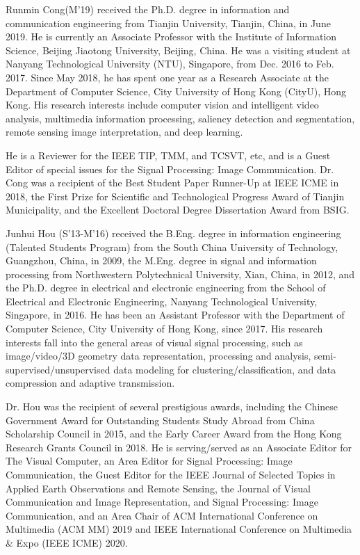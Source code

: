 \documentclass[journal]{IEEEtran}
\begin{document}
\vspace{-10 mm}
\begin{IEEEbiography}{Runmin Cong}(M'19)
received the Ph.D. degree in information and communication engineering from Tianjin University, Tianjin, China, in June 2019.
He is currently an Associate Professor with the Institute of Information Science, Beijing Jiaotong University, Beijing, China. He was a visiting student at Nanyang Technological University (NTU), Singapore, from Dec. 2016 to Feb. 2017. Since May 2018, he has spent one year as a Research Associate at the Department of Computer Science, City University of Hong Kong (CityU), Hong Kong. His research interests include computer vision and intelligent video analysis, multimedia information processing, saliency detection and segmentation, remote sensing image interpretation, and deep learning.\par
He is a Reviewer for the IEEE TIP, TMM, and TCSVT, etc, and is a Guest Editor of special issues for the Signal Processing: Image Communication. Dr. Cong was a recipient of the Best Student Paper Runner-Up at IEEE ICME in 2018, the First Prize for Scientific and Technological Progress Award of Tianjin Municipality, and the Excellent Doctoral Degree Dissertation Award from BSIG.
\end{IEEEbiography}
\vspace{-10 mm}
\begin{IEEEbiography}{Junhui Hou}
(S'13-M'16) received the B.Eng. degree in information engineering (Talented Students Program) from the South China University of Technology, Guangzhou, China, in 2009, the M.Eng. degree in signal and information processing from Northwestern Polytechnical University, Xian, China, in 2012, and the Ph.D. degree in electrical and electronic engineering from the School of Electrical and Electronic Engineering, Nanyang Technological University, Singapore, in 2016. He has been an Assistant Professor with the Department of Computer Science, City University of Hong Kong, since 2017. His research interests fall into the general areas of visual signal processing, such as image/video/3D geometry data representation, processing and analysis, semi-supervised/unsupervised data modeling for clustering/classification, and data compression and adaptive transmission.\par
Dr. Hou was the recipient of several prestigious awards, including the Chinese Government Award for Outstanding Students Study Abroad from China Scholarship Council in 2015, and the Early Career Award from the Hong Kong Research Grants Council in 2018. He is serving/served as an Associate Editor for The Visual Computer, an Area Editor for Signal Processing: Image Communication, the Guest Editor for the IEEE Journal of Selected Topics in Applied Earth Observations and Remote Sensing, the Journal of Visual Communication and Image Representation, and Signal Processing: Image Communication, and an Area Chair of ACM International Conference on Multimedia (ACM MM) 2019 and IEEE International Conference on Multimedia \& Expo (IEEE ICME) 2020.
\end{IEEEbiography}
\end{document}
